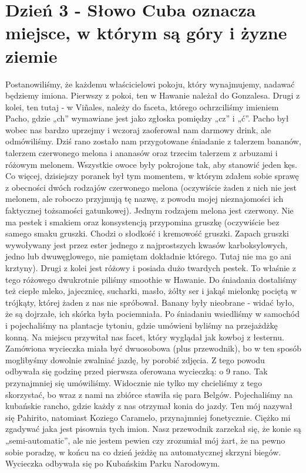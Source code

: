 
\chapter[Słowo Cuba oznacza miejsce, w którym są góry i żyzne ziemie]{Dzień 3 - Słowo Cuba oznacza miejsce, w którym są góry i żyzne ziemie}

Postanowiliśmy, że każdemu właścicielowi pokoju, który wynajmujemy, nadawać będziemy imiona.
Pierwszy z pokoi, ten w Hawanie należał do Gonzalesa.
Drugi z kolei, ten tutaj - w Viñales, należy do faceta, którego ochrzciliśmy imieniem Pacho, gdzie „ch” wymawiane jest jako zgłoska pomiędzy „cz” i „ć”.
Pacho był wobec nas bardzo uprzejmy i wczoraj zaoferował nam darmowy drink, ale odmówiliśmy.
Dziś rano zostało nam przygotowane śniadanie z talerzem bananów, talerzem czerwonego melona i ananasów oraz trzecim talerzem z arbuzami i różowym melonem.
Wszystkie owoce były pokrojone tak, aby stanowić jeden kęs.
Co więcej, dzisiejszy poranek był tym momentem, w którym zdałem sobie sprawę z obecności dwóch rodzajów czerwonego melona (oczywiście żaden z nich nie jest melonem, ale roboczo przyjmują tę nazwę, z powodu mojej nieznajomości ich faktycznej tożsamości gatunkowej).
Jednym rodzajem melona jest czerwony.
Nie ma pestek i smakiem oraz konsystencją przypomina gruszkę (oczywiście bez samego smaku gruszki.
Chodzi o słodkość i kremowość gruszki.
Zapach gruszki wywoływany jest przez ester jednego z najprostszych kwasów karboksylowych, jedno lub dwuwęglowego, nie pamiętam dokładnie którego.
Tutaj nie ma go ani krztyny).
Drugi z kolei jest różowy i posiada dużo twardych pestek.
To właśnie z tego różowego dwukrotnie piliśmy smoothie w Hawanie.
Do śniadania dostaliśmy też ciepłe mleko, jajecznicę, sucharki, masło, żółty ser i jakąś mielonkę pociętą w trójkąty, której żaden z nas nie spróbował.
Banany były nieobrane - widać było, że są dojrzałe, ich skórka była pociemniała.
Po śniadaniu wsiedliśmy w samochód i pojechaliśmy na plantacje tytoniu, gdzie umówieni byliśmy na przejażdżkę konną.
Na miejscu przywitał nas facet, który wyglądał jak kowboj z łesternu.
Zamówiona wycieczka miała być dwuosobowa (plus przewodnik), bo w ten sposób moglibyśmy dowolnie zwalniać jazdę, by porobić zdjęcia.
Z tego powodu odbywała się godzinę przed pierwsza oferowana wycieczką: o 9 rano.
Tak przynajmniej się umówiliśmy.
Widocznie nie tylko my chcieliśmy z tego skorzystać, bo wraz z nami na zbiórce stawiła się para Belgów.
Pojechaliśmy na kubańskie rancho, gdzie każdy z nas otrzymał konia do jazdy.
Ten mój nazywał się Pahirito, natomiast Koziego Caramelo, przynajmniej fonetycznie.
Ciężko mi zgadywać jaka jest pisownia tych imion.
Nasz przewodnik zarzekał się, że konie są „semi-automatic”, ale nie jestem pewien czy zrozumiał mój żart, że na pewno sobie poradzę, w końcu na co dzień jeżdżę na automatycznej skrzyni biegów.
Wycieczka odbywała się po Kubańskim Parku Narodowym.

